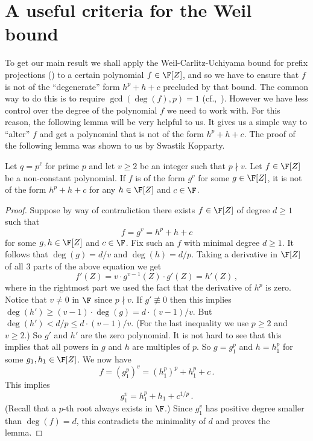 \section{A useful criteria for the Weil bound}\label{sec-weil}
To get our main result we shall apply the Weil-Carlitz-Uchiyama bound for prefix projections () to
a certain polynomial $f\in \F[Z]$, and so we have to ensure that $f$ is not of the
``degenerate'' form $h^p+h+c$ precluded by that bound. The common way
to do this is to require $\gcd(\deg(f),p) =1$ (cf.,~\cite{GR08,DG10}). However we have less control
%
over
the degree of the polynomial $f$ we need to work with.
For this reason, the following lemma will be very helpful to us.
It gives us a simple way to ``alter'' $f$ and get a polynomial that is not of the
form $h^p+ h+c$.
The proof of the following lemma was shown to us by Swastik Kopparty.
\begin{lemma}\label{lem-powerhelps}
Let $q=p^{\ell}$ for prime $p$ and let $v\geq 2$ be an integer such that $p\nmid v$.
Let $f\in \F[Z]$ be a non-constant polynomial. If $f$ is of the form $g^v$ for some $g\in \F[Z]$, it
is not of the form $h^p +h + c$ for any $h\in \F[Z]$ and $c\in \F$.
\end{lemma}
\begin{proof}
Suppose by way of contradiction there exists $f\in\F[Z]$ of degree $d\geq 1$
such that
\[f = g^v= h^p + h + c\]
 for some $g,h\in \F[Z]$ and $c\in \F$.
 Fix such an $f$ with minimal degree $d\geq 1$.
It follows that $\deg(g)= d/v$ and $\deg(h) = d/p$.
Taking a derivative in $\F[Z]$ of all 3 parts of the above equation we get
\[f'(Z) =  v\cdot g^{v-1}(Z)\cdot g'(Z)= h'(Z)\,,\]
where in the rightmost part we used the fact that the derivative of $h^p$ is zero.
Notice that $v\neq 0$ in $\F$ since $p\nmid v$.
%
%
If $g'\not\equiv 0$ then this implies $\deg(h') \geq (v-1)\cdot
\deg(g)= d \cdot{(v-1)}/{v}$.
%
%
%
%
%
%
%
%
 But $\deg(h') < d/p \le d\cdot {(v-1)}/{v}$.
 (For the last inequality we use $p\geq 2$ and $v\geq 2$.)
%
So $g'$ and $h'$ are the zero polynomial.
It is not hard to see that this implies that all powers in
$g$ and $h$ are multiples of $p$.
So $g= g_1^p$ and $h=h_1^p$ for some $g_1,h_1\in \F[Z]$.
We now have
\[f = (g_1^p)^v = (h_1^p)^p  + h_1^p + c\,.\]
This implies
\[ g_1^v = h_1^p + h_1 + c^{1/p}\,.\]
%
%
 (Recall that a $p$-th root always exists in $\F$.)
Since $g_1^v$ has positive degree smaller than $\deg(f)=d$, this contradicts the minimality of $d$ and proves the lemma.
\end{proof}
\noindent

